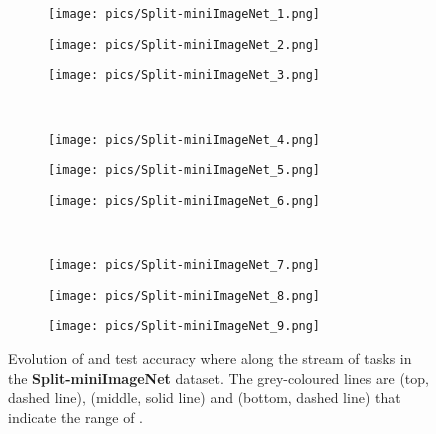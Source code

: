 \documentclass{article} \usepackage{collas2022_conference,times}
\begin{document}
    \begin{figure*}[t!]
        \centering
        \begin{subfigure}[b]{0.32\textwidth}
            \texttt{[image: pics/Split-miniImageNet\_1.png]}\caption{}
        \end{subfigure}
        \hfill
        \begin{subfigure}[b]{0.32\textwidth}
            \texttt{[image: pics/Split-miniImageNet\_2.png]}\caption{}
        \end{subfigure}
        \hfill
        \begin{subfigure}[b]{0.32\textwidth}
            \texttt{[image: pics/Split-miniImageNet\_3.png]}\caption{}
        \end{subfigure}
        \\
        \begin{subfigure}[b]{0.32\textwidth}
            \texttt{[image: pics/Split-miniImageNet\_4.png]}\caption{}
        \end{subfigure}
        \hfill
        \begin{subfigure}[b]{0.32\textwidth}
            \texttt{[image: pics/Split-miniImageNet\_5.png]}\caption{}
        \end{subfigure}
        \hfill
        \begin{subfigure}[b]{0.32\textwidth}
            \texttt{[image: pics/Split-miniImageNet\_6.png]}\caption{}
        \end{subfigure}
        \\
        \begin{subfigure}[b]{0.32\textwidth}
            \texttt{[image: pics/Split-miniImageNet\_7.png]}\caption{}
        \end{subfigure}
        \hfill
        \begin{subfigure}[b]{0.32\textwidth}
            \texttt{[image: pics/Split-miniImageNet\_8.png]}\caption{}
        \end{subfigure}
        \hfill
        \begin{subfigure}[b]{0.32\textwidth}
            \texttt{[image: pics/Split-miniImageNet\_9.png]}\caption{}
        \end{subfigure}
        \caption{Evolution of  and test accuracy  where  along the stream of  tasks in the \textbf{Split-miniImageNet} dataset. The grey-coloured lines are   (top, dashed line),   (middle, solid line) and   (bottom, dashed line) that indicate the range of . }
        \label{alpha_imagenet_app}
    \end{figure*}
\end{document}
